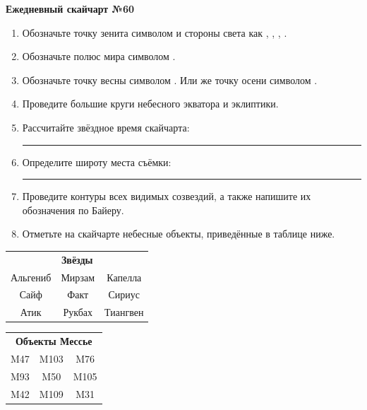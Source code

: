 \documentclass{./SAS-class-skygen}
\begin{document}
    
    
    
	\begin{center}
		\large\textbf{Ежедневный скайчарт №60}
	\end{center}

	\begin{enumerate}
		\item Обозначьте точку зенита символом  и стороны света как , , , .
		\item Обозначьте полюс мира символом .
		\item Обозначьте точку весны символом \Aries. Или же точку осени символом \Libra.
		\item Проведите большие круги небесного экватора и эклиптики.
		\item Рассчитайте звёздное время скайчарта: \rule{2cm}{0.4pt}
		\item Определите широту места съёмки: \rule{2cm}{0.4pt}
		\item Проведите контуры всех видимых созвездий, а также напишите их обозначения по Байеру.
		\item Отметьте на скайчарте небесные объекты, приведённые в таблице ниже.
	\end{enumerate}
	
    \vspace{0.5cm}

    \begin{table}[h!]
    \centering
    \begin{tabular}{ccc}
    \multicolumn{3}{c}{\textbf{Звёзды}} \\ Альгениб & Мирзам & Капелла \\
Сайф & Факт & Сириус \\
Атик & Рукбах & Тиангвен \\

\end{tabular}
    \hfill
    \begin{tabular}{ccc}
    \multicolumn{3}{c}{\textbf{Объекты Мессье}} \\ M47 & M103 & M76 \\
M93 & M50 & M105 \\
M42 & M109 & M31 \\

\end{tabular}
    \end{table}
	
\end{document}
